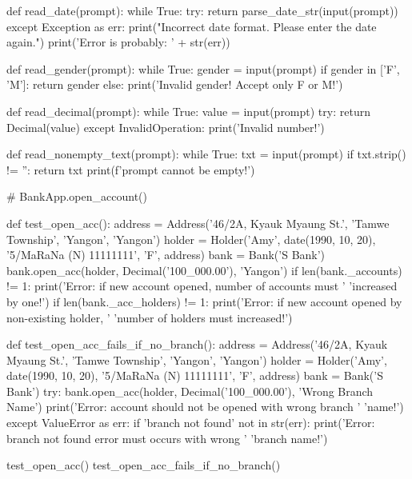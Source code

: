 \begin{py}
def read_date(prompt):
    while True:
        try:
            return parse_date_str(input(prompt))
        except Exception as err:
            print("Incorrect date format. Please enter the date again.")
            print('Error is probably: ' + str(err))


def read_gender(prompt):
    while True:
        gender = input(prompt)
        if gender in ['F', 'M']:
            return gender
        else:
            print('Invalid gender! Accept only F or M!')


def read_decimal(prompt):
    while True:
        value = input(prompt)
        try:
            return Decimal(value)
        except InvalidOperation:
            print('Invalid number!')


def read_nonempty_text(prompt):
    while True:
        txt = input(prompt)
        if txt.strip() != '':
            return txt
        print(f'{prompt} cannot be empty!')


# BankApp.open_account()


def test_open_acc():
    address = Address('46/2A, Kyauk Myaung St.',
                      'Tamwe Township',
                      'Yangon',
                      'Yangon')
    holder = Holder('Amy',
                    date(1990, 10, 20),
                    '5/MaRaNa (N) 11111111',
                    'F',
                    address)
    bank = Bank('S Bank')
    bank.open_acc(holder, Decimal('100_000.00'), 'Yangon')
    if len(bank._accounts) != 1:
        print('Error: if new account opened, number of accounts must '
              'increased by one!')
    if len(bank._acc_holders) != 1:
        print('Error: if new account opened by non-existing holder, '
              'number of holders must increased!')


def test_open_acc_fails_if_no_branch():
    address = Address('46/2A, Kyauk Myaung St.',
                      'Tamwe Township',
                      'Yangon',
                      'Yangon')
    holder = Holder('Amy',
                    date(1990, 10, 20),
                    '5/MaRaNa (N) 11111111',
                    'F',
                    address)
    bank = Bank('S Bank')
    try:
        bank.open_acc(holder, Decimal('100_000.00'), 'Wrong Branch Name')
        print('Error: account should not be opened with wrong branch '
              'name!')
    except ValueError as err:
        if 'branch not found' not in str(err):
            print('Error: branch not found error must occurs with wrong '
                  'branch name!')


test_open_acc()
test_open_acc_fails_if_no_branch()

\end{py}
%

